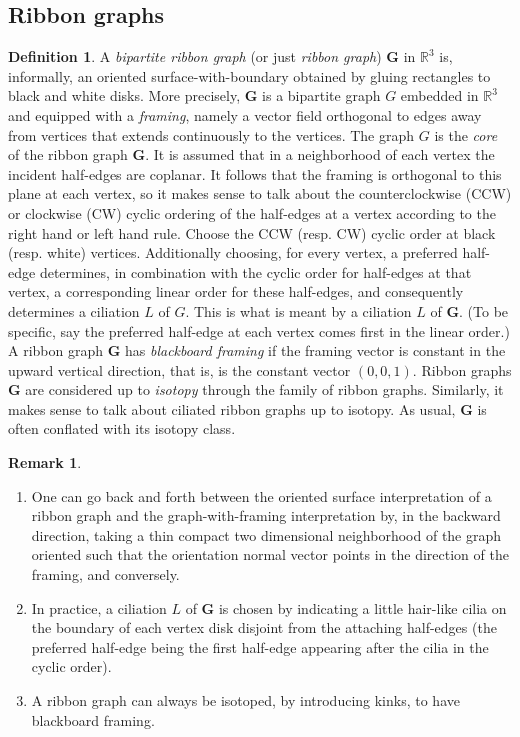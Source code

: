 \documentclass[12pt, reqno]{amsart}
\theoremstyle{definition}
\newtheorem{defi}[theo]{Definition}
\newtheorem{rema}[theo]{Remark}
\newcommand{\R}{\mathbb{R}}%
\begin{document}
\subsection{Ribbon graphs}

\begin{defi}

A \emph{bipartite ribbon graph} (or just \emph{ribbon graph}) $\mathbf{G}$ in $\R^3$ is, informally, an oriented surface-with-boundary obtained by gluing rectangles to black and white disks.  More precisely, $\mathbf{G}$ is a bipartite graph $G$ embedded in $\R^3$ and equipped with a \emph{framing}, namely a vector field orthogonal to edges away from vertices that extends continuously to the vertices.  The graph $G$ is the \emph{core} of the ribbon graph $\mathbf{G}$.  It is assumed that in a neighborhood of each vertex the incident half-edges are coplanar.  It follows that the framing is orthogonal to this plane at each vertex, so it makes sense to talk about the counterclockwise (CCW) or clockwise (CW) cyclic ordering of the half-edges at a vertex according to the right hand or left hand rule.  Choose the CCW (resp. CW) cyclic order at black (resp. white) vertices.  Additionally choosing, for every vertex, a preferred half-edge determines, in combination with the cyclic order for half-edges at that vertex, a corresponding linear order for these half-edges, and consequently determines a ciliation $L$ of $G$.  This is what is meant by a ciliation $L$ of $\mathbf{G}$.  (To be specific, say the preferred half-edge at each vertex comes first in the linear order.)  A ribbon graph $\mathbf{G}$ has \emph{blackboard framing} if the framing vector is constant in the upward vertical direction, that is, is the constant vector $(0,0,1)$.  Ribbon graphs $\mathbf{G}$ are considered up to \emph{isotopy} through the family of ribbon graphs.  Similarly, it makes sense to talk about ciliated ribbon graphs up to isotopy.  As usual, $\mathbf{G}$ is often conflated with its isotopy class.
\end{defi}

\begin{rema}
\begin{enumerate}
\item
One can go back and forth between the oriented surface interpretation of a ribbon graph and the graph-with-framing interpretation by, in the backward direction, taking a thin compact two dimensional neighborhood of the graph oriented such that the orientation normal vector points in the direction of the framing, and conversely.
\item
In practice, a ciliation $L$ of $\mathbf{G}$ is chosen by indicating a little hair-like cilia on the boundary of each vertex disk disjoint from the attaching half-edges (the preferred half-edge being the first half-edge appearing after the cilia in the cyclic order).
\item
A ribbon graph can always be isotoped, by introducing kinks, to have blackboard framing.
\end{enumerate}
\end{rema}
\end{document}
